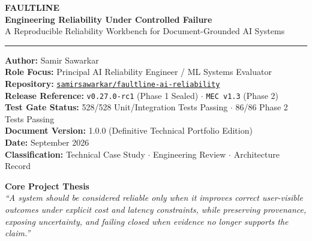 \documentclass[10pt,letterpaper]{article}
\newcommand{\code}[1]{\colorbox{codebg}{\small\texttt{#1}}}
\begin{document}
\begin{titlepage}
\begin{center}
\vspace*{1.5cm}

{\Huge\bfseries\color{primary}\textsf{FAULTLINE}}\\[0.4cm]
{\LARGE\bfseries\color{secondary}\textsf{Engineering Reliability Under Controlled Failure}}\\[0.3cm]
{\large\textsf{A Reproducible Reliability Workbench for Document-Grounded AI Systems}}\\[0.6cm]

\rule{0.8\textwidth}{1.5pt}

\vfill

\begin{minipage}{0.75\textwidth}
\small\textsf{
\textbf{Author:} Samir Sawarkar\\[0.15cm]
\textbf{Role Focus:} Principal AI Reliability Engineer / ML Systems Evaluator\\[0.15cm]
\textbf{Repository:} \href{https://github.com/samirsawarkar/faultline-ai-reliability}{\code{samirsawarkar/faultline-ai-reliability}}\\[0.15cm]
\textbf{Release Reference:} \code{v0.27.0-rc1} (Phase 1 Sealed) $\cdot$ \code{MEC v1.3} (Phase 2)\\[0.15cm]
\textbf{Test Gate Status:} 528/528 Unit/Integration Tests Passing $\cdot$ 86/86 Phase 2 Tests Passing\\[0.15cm]
\textbf{Document Version:} 1.0.0 (Definitive Technical Portfolio Edition)\\[0.15cm]
\textbf{Date:} September 2026\\[0.15cm]
\textbf{Classification:} Technical Case Study $\cdot$ Engineering Review $\cdot$ Architecture Record
}
\end{minipage}

\vfill

\begin{framed}
\centering\small\sffamily
\textbf{Core Project Thesis}\\[0.2cm]
\textit{``A system should be considered reliable only when it improves correct user-visible outcomes under explicit cost and latency constraints, while preserving provenance, exposing uncertainty, and failing closed when evidence no longer supports the claim.''}
\end{framed}


\end{center}
\end{titlepage}
\end{document}
